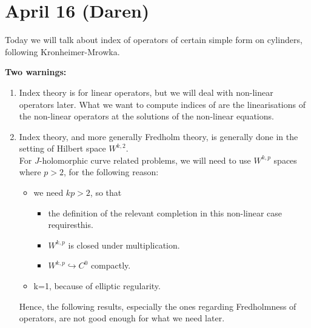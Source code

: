 \section*{\textbf{April 16 (Daren)}}

	Today we will talk about index of operators of certain simple form on cylinders, following Kronheimer-Mrowka.
\newline
		
		
		\textbf{Two warnings:}\\
		\begin{enumerate}
			\item Index theory is for linear operators, but we will deal with non-linear operators later. What we want to compute indices of are the linearisations of the non-linear operators at the solutions of the non-linear equations.
			\item Index theory, and more generally Fredholm theory, is generally done in the setting of Hilbert space $W^{k,2}$. \\
			For $J$-holomorphic curve related problems, we will need to use $W^{k,p}$ spaces where $p>2$, for the following reason:
			 \begin{itemize}
			 	\item we need $kp >2$, so that
			 	 \begin{itemize}
			 	 	\item the definition of the relevant completion in this non-linear case requiresthis.
			 	 	\item $W^{k,p}$ is closed under multiplication.
			 	 	\item $W^{k,p}\hookrightarrow C^0$ compactly.
			 	 \end{itemize}
			 	\item k=1, because of elliptic regularity.
			 \end{itemize}
			 Hence, the following results, especially the ones regarding Fredholmness of operators, are not good enough for what we need later.
		\end{enumerate}
		
